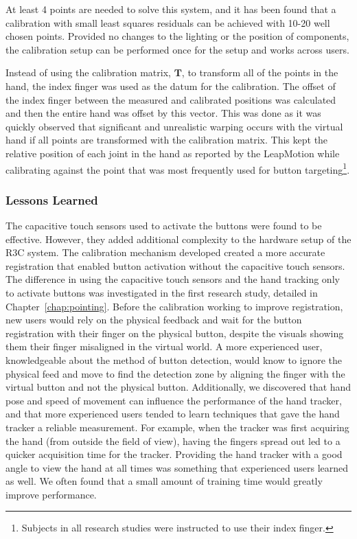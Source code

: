 At least 4 points are needed to solve this system, and it has been found that a calibration with small least squares residuals can be achieved with 10-20 well chosen points.
Provided no changes to the lighting or the position of components, the calibration setup can be performed once for the setup and works across users.

Instead of using the calibration matrix, $\mathbf{T}$, to transform all of the points in the hand, the index finger was used as the datum for the calibration.
The offset of the index finger between the measured and calibrated positions was calculated and then the entire hand was offset by this vector.
This was done as it was quickly observed that significant and unrealistic warping occurs with the virtual hand if all points are transformed with the calibration matrix.
This kept the relative position of each joint in the hand as reported by the LeapMotion while calibrating against the point that was most frequently used for button targeting\footnote{Subjects in all research studies were instructed to use their index finger.}.

\subsubsection{Lessons Learned}

The capacitive touch sensors used to activate the buttons were found to be effective.
However, they added additional complexity to the hardware setup of the R3C system.
The calibration mechanism developed created a more accurate registration that enabled button activation without the capacitive touch sensors.
The difference in using the capacitive touch sensors and the hand tracking only to activate buttons was investigated in the first research study, detailed in Chapter~\ref{chap:pointing}.
Before the calibration working to improve registration, new users would rely on the physical feedback and wait for the button registration with their finger on the physical button, despite the visuals showing them their finger misaligned in the virtual world.
A more experienced user, knowledgeable about the method of button detection, would know to ignore the physical feed and move to find the detection zone by aligning the finger with the virtual button and not the physical button.
Additionally, we discovered that hand pose and speed of movement can influence the performance of the hand tracker, and that more experienced users tended to learn techniques that gave the hand tracker a reliable measurement.
For example, when the tracker was first acquiring the hand (from outside the field of view), having the fingers spread out led to a quicker acquisition time for the tracker.
Providing the hand tracker with a good angle to view the hand at all times was something that experienced users learned as well.
We often found that a small amount of training time would greatly improve performance.

